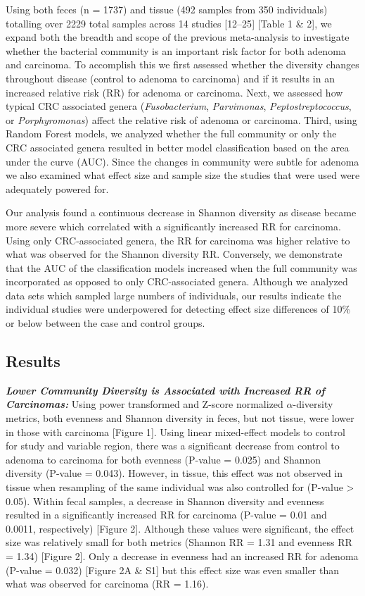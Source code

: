 \documentclass[12pt,]{article}
\begin{document}
Using both feces (n = 1737) and tissue (492 samples from 350
individuals) totalling over 2229 total samples across 14 studies
{[}12--25{]} {[}Table 1 \& 2{]}, we expand both the breadth and scope of
the previous meta-analysis to investigate whether the bacterial
community is an important risk factor for both adenoma and carcinoma. To
accomplish this we first assessed whether the diversity changes
throughout disease (control to adenoma to carcinoma) and if it results
in an increased relative risk (RR) for adenoma or carcinoma. Next, we
assessed how typical CRC associated genera (\emph{Fusobacterium},
\emph{Parvimonas}, \emph{Peptostreptococcus}, or \emph{Porphyromonas})
affect the relative risk of adenoma or carcinoma. Third, using Random
Forest models, we analyzed whether the full community or only the CRC
associated genera resulted in better model classification based on the
area under the curve (AUC). Since the changes in community were subtle
for adenoma we also examined what effect size and sample size the
studies that were used were adequately powered for.

Our analysis found a continuous decrease in Shannon diversity as disease
became more severe which correlated with a significantly increased RR
for carcinoma. Using only CRC-associated genera, the RR for carcinoma
was higher relative to what was observed for the Shannon diversity RR.
Conversely, we demonstrate that the AUC of the classification models
increased when the full community was incorporated as opposed to only
CRC-associated genera. Although we analyzed data sets which sampled
large numbers of individuals, our results indicate the individual
studies were underpowered for detecting effect size differences of 10\%
or below between the case and control groups.

\newpage

\subsection{Results}\label{results}

\textbf{\emph{Lower Community Diversity is Associated with Increased RR
of Carcinomas:}} Using power transformed and Z-score normalized
\(\alpha\)-diversity metrics, both evenness and Shannon diversity in
feces, but not tissue, were lower in those with carcinoma {[}Figure
1{]}. Using linear mixed-effect models to control for study and variable
region, there was a significant decrease from control to adenoma to
carcinoma for both evenness (P-value = 0.025) and Shannon diversity
(P-value = 0.043). However, in tissue, this effect was not observed in
tissue when resampling of the same individual was also controlled for
(P-value \textgreater{} 0.05). Within fecal samples, a decrease in
Shannon diversity and evenness resulted in a significantly increased RR
for carcinoma (P-value = 0.01 and 0.0011, respectively) {[}Figure 2{]}.
Although these values were significant, the effect size was relatively
small for both metrics (Shannon RR = 1.31 and evenness RR = 1.34)
{[}Figure 2{]}. Only a decrease in evenness had an increased RR for
adenoma (P-value = 0.032) {[}Figure 2A \& S1{]} but this effect size was
even smaller than what was observed for carcinoma (RR = 1.16).
\end{document}
